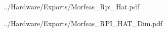 \newpage

{../Hardware/Exports/Morfeas_Rpi_Hat.pdf}
\newpage

{../Hardware/Exports/Morfeas_RPI_HAT_Dim.pdf}
\newpage
